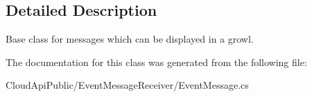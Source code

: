 \subsection{Detailed Description}
Base class for messages which can be displayed in a growl. 



The documentation for this class was generated from the following file\-:\begin{DoxyCompactItemize}
\item 
Cloud\-Api\-Public/\-Event\-Message\-Receiver/Event\-Message.\-cs\end{DoxyCompactItemize}

